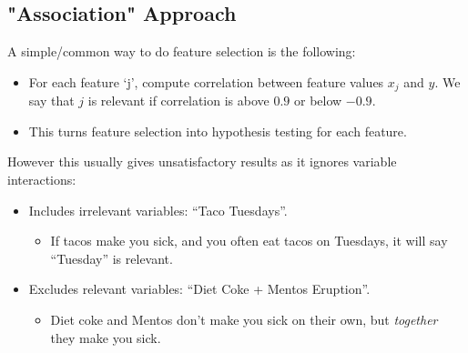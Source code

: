 \documentclass{article}
\def\red#1{{\color{red}#1}}
\theoremstyle{definition}
\begin{document}
\subsection*{"Association" Approach}
A simple/common way to do feature selection is the following:
\begin{itemize}
	\item For each feature ‘j’, compute correlation between feature values $ x_j $ and $ y $. We say that $ j $ is relevant if correlation is above $ 0.9 $ or below $ -0.9 $.
	\item This turns feature selection into hypothesis testing for each feature.
\end{itemize}
However this usually gives unsatisfactory results as it \red{ignores variable interactions}: 
\begin{itemize}
	\item \red{Includes irrelevant variables}: “Taco Tuesdays”.
\begin{itemize}
	\item If tacos make you sick, and you often eat tacos on Tuesdays, it will say “Tuesday” is relevant. 
\end{itemize}
\item \red{Excludes relevant variables}: “Diet Coke + Mentos Eruption”.
\begin{itemize}
	\item Diet coke and Mentos don’t make you sick on their own, but \textit{together} they make you sick.
\end{itemize}
\end{itemize}
\end{document}
